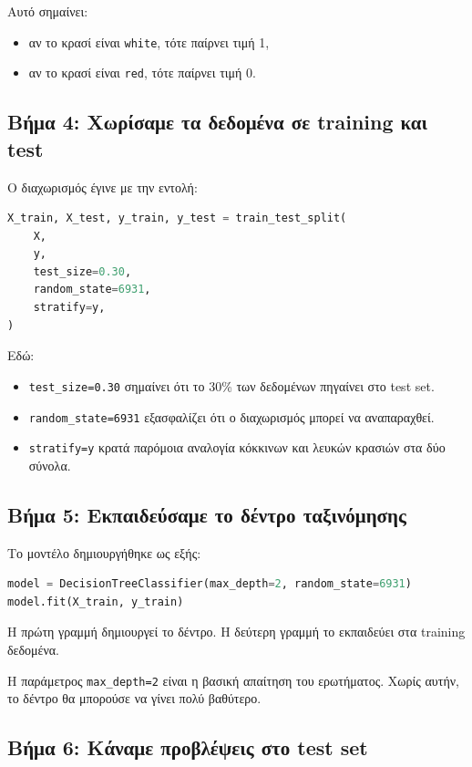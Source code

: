 \documentclass[12pt,a4paper]{article}
\newcommand{\code}[1]{\texttt{\textenglish{#1}}}
\begin{document}
Αυτό σημαίνει:

\begin{itemize}[nosep]
    \item αν το κρασί είναι \code{white}, τότε παίρνει τιμή 1,
    \item αν το κρασί είναι \code{red}, τότε παίρνει τιμή 0.
\end{itemize}

\subsection{Βήμα 4: Χωρίσαμε τα δεδομένα σε training και test}

Ο διαχωρισμός έγινε με την εντολή:

\begin{lstlisting}[language=Python]
X_train, X_test, y_train, y_test = train_test_split(
    X,
    y,
    test_size=0.30,
    random_state=6931,
    stratify=y,
)
\end{lstlisting}

Εδώ:

\begin{itemize}
    \item \code{test\_size=0.30} σημαίνει ότι το 30\% των δεδομένων πηγαίνει
    στο test set.
    \item \code{random\_state=6931} εξασφαλίζει ότι ο διαχωρισμός μπορεί να
    αναπαραχθεί.
    \item \code{stratify=y} κρατά παρόμοια αναλογία κόκκινων και λευκών
    κρασιών στα δύο σύνολα.
\end{itemize}

\subsection{Βήμα 5: Εκπαιδεύσαμε το δέντρο ταξινόμησης}

Το μοντέλο δημιουργήθηκε ως εξής:

\begin{lstlisting}[language=Python]
model = DecisionTreeClassifier(max_depth=2, random_state=6931)
model.fit(X_train, y_train)
\end{lstlisting}

Η πρώτη γραμμή δημιουργεί το δέντρο. Η δεύτερη γραμμή το εκπαιδεύει στα
training δεδομένα.

Η παράμετρος \code{max\_depth=2} είναι η βασική απαίτηση του ερωτήματος.
Χωρίς αυτήν, το δέντρο θα μπορούσε να γίνει πολύ βαθύτερο.

\subsection{Βήμα 6: Κάναμε προβλέψεις στο test set}
\end{document}
